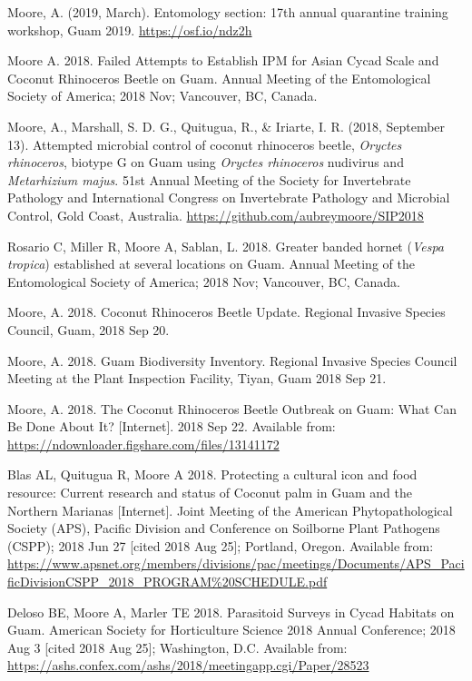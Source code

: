 \documentclass[12pt,english]{simplecv}
\begin{document}
\begin{thebibliography}{999}
\bibitem{} Moore, A. (2019, March). Entomology section: 17th annual quarantine training workshop, Guam 2019. \url{https://osf.io/ndz2h}





\bibitem{}Moore A. 2018. Failed Attempts to Establish IPM for Asian Cycad Scale and Coconut Rhinoceros Beetle on Guam. Annual Meeting of the Entomological Society of America; 2018 Nov; Vancouver, BC, Canada.

\bibitem{} Moore, A., Marshall, S. D. G., Quitugua, R., \& Iriarte, I. R. (2018, September 13). Attempted microbial control of coconut rhinoceros beetle, \textit{Oryctes rhinoceros}, biotype G on Guam using \textit{Oryctes rhinoceros} nudivirus and \textit{Metarhizium majus}. 51st Annual Meeting of the Society for Invertebrate Pathology and International Congress on Invertebrate Pathology and Microbial Control, Gold Coast, Australia. \url{https://github.com/aubreymoore/SIP2018}
 
\bibitem{}Rosario C, Miller R, Moore A, Sablan, L. 2018. Greater banded hornet (\textit{Vespa tropica}) established at several locations on Guam. Annual Meeting of the Entomological Society of America; 2018 Nov; Vancouver, BC, Canada. 
	
\bibitem{}Moore, A. 2018. Coconut Rhinoceros Beetle Update. Regional Invasive Species Council, Guam, 2018 Sep 20. 

\bibitem{}Moore, A. 2018. Guam Biodiversity Inventory. Regional Invasive Species Council Meeting at the Plant Inspection Facility, Tiyan, Guam 2018 Sep 21. 

\bibitem{}Moore, A. 2018. The Coconut Rhinoceros Beetle Outbreak on Guam: What Can Be Done About It? [Internet]. 2018 Sep 22. Available from: \url{https://ndownloader.figshare.com/files/13141172}

\bibitem{}Blas AL, Quitugua R, Moore A 2018. Protecting a cultural icon and food resource: Current research and status of Coconut palm in Guam and the Northern Marianas [Internet]. Joint Meeting of the American Phytopathological Society (APS), Pacific Division and Conference on Soilborne Plant Pathogens (CSPP); 2018 Jun 27 [cited 2018 Aug 25]; Portland, Oregon. Available from: \url{https://www.apsnet.org/members/divisions/pac/meetings/Documents/APS\_PacificDivisionCSPP\_2018\_PROGRAM%20SCHEDULE.pdf}
	
\bibitem{}Deloso BE, Moore A, Marler TE 2018. Parasitoid Surveys in Cycad Habitats on Guam. American Society for Horticulture Science 2018 Annual Conference; 2018 Aug 3 [cited 2018 Aug 25]; Washington, D.C. Available from: \url{https://ashs.confex.com/ashs/2018/meetingapp.cgi/Paper/28523}
	

\end{thebibliography}
\end{document}
